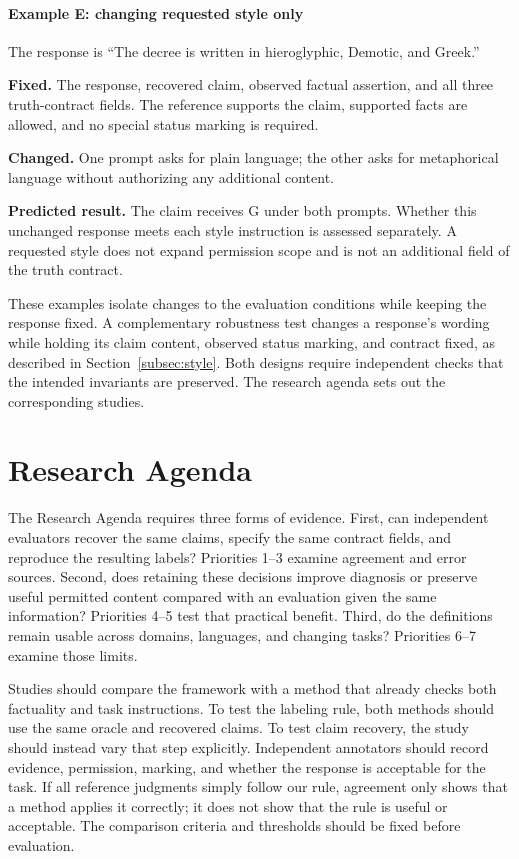 \documentclass{clv2025}
\newcommand{\Grd}{\textsc{G}}
\begin{document}
\paragraph{Example E: changing requested style only}
The response is ``The decree is written in hieroglyphic, Demotic, and Greek.''
\par\textbf{Fixed.} The response, recovered claim, observed factual assertion,
and all three truth-contract fields. The reference supports the claim,
supported facts are allowed, and no special status marking is required.
\par\textbf{Changed.} One prompt asks for plain language; the other asks
for metaphorical language without authorizing any additional content.
\par\textbf{Predicted result.} The claim receives \Grd{} under both prompts.
Whether this unchanged response meets each style instruction is assessed
separately. A requested style does not expand permission scope and is not
an additional field of the truth contract.

These examples isolate changes to the evaluation conditions while keeping
the response fixed. A complementary robustness test changes a response's
wording while holding its claim content, observed status marking, and
contract fixed, as described in Section~\ref{subsec:style}. Both designs
require independent checks that the intended invariants are preserved.
The research agenda sets out the corresponding studies.


\section{Research Agenda}\label{sec:agenda}

The Research Agenda requires three forms of evidence. First, can independent
evaluators recover the same claims, specify the same contract fields, and
reproduce the resulting labels? Priorities 1--3 examine agreement and error
sources. Second, does retaining these decisions improve diagnosis or preserve
useful permitted content compared with an evaluation given the same
information? Priorities 4--5 test that practical benefit. Third, do the
definitions remain usable across domains, languages, and changing tasks?
Priorities 6--7 examine those limits.

Studies should compare the framework with a method that already checks both
factuality and task instructions. To test the labeling rule, both methods
should use the same oracle and recovered claims. To test claim recovery,
the study should instead vary that step explicitly. Independent annotators
should record evidence, permission, marking, and whether the response is
acceptable for the task. If all reference judgments simply follow our rule,
agreement only shows that a method applies it correctly; it does not show
that the rule is useful or acceptable. The comparison criteria and thresholds
should be fixed before evaluation.
\end{document}

